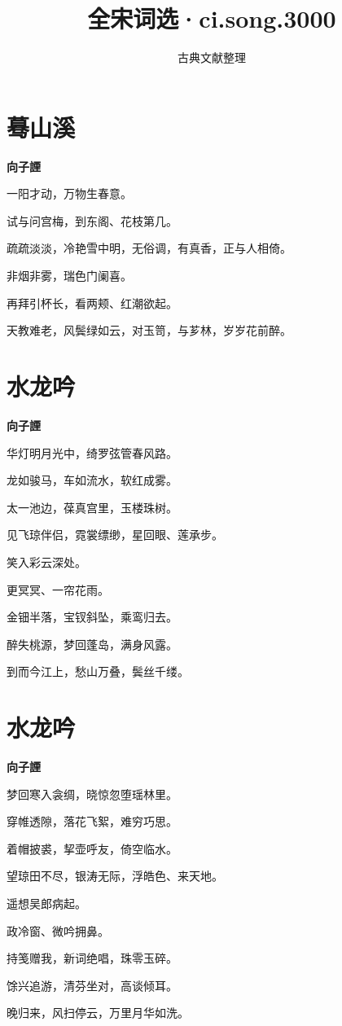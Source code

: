 \documentclass[12pt,a4paper]{ctexbook}
\title{全宋词选·ci.song.3000}
\author{古典文献整理}
\date{}
\begin{document}
\maketitle
\tableofcontents
\newpage
\section{蓦山溪}
\textbf{向子諲}\par\vspace{0.5em}
一阳才动，万物生春意。\par
试与问宫梅，到东阁、花枝第几。\par
疏疏淡淡，冷艳雪中明，无俗调，有真香，正与人相倚。\par
非烟非雾，瑞色门阑喜。\par
再拜引杯长，看两颊、红潮欲起。\par
天教难老，风鬓绿如云，对玉笥，与芗林，岁岁花前醉。\par

\section{水龙吟}
\textbf{向子諲}\par\vspace{0.5em}
华灯明月光中，绮罗弦管春风路。\par
龙如骏马，车如流水，软红成雾。\par
太一池边，葆真宫里，玉楼珠树。\par
见飞琼伴侣，霓裳缥缈，星回眼、莲承步。\par
笑入彩云深处。\par
更冥冥、一帘花雨。\par
金钿半落，宝钗斜坠，乘鸾归去。\par
醉失桃源，梦回蓬岛，满身风露。\par
到而今江上，愁山万叠，鬓丝千缕。\par

\section{水龙吟}
\textbf{向子諲}\par\vspace{0.5em}
梦回寒入衾绸，晓惊忽堕瑶林里。\par
穿帷透隙，落花飞絮，难穷巧思。\par
着帽披裘，挈壶呼友，倚空临水。\par
望琼田不尽，银涛无际，浮皓色、来天地。\par
遥想吴郎病起。\par
政冷窗、微吟拥鼻。\par
持笺赠我，新词绝唱，珠零玉碎。\par
馀兴追游，清芬坐对，高谈倾耳。\par
晚归来，风扫停云，万里月华如洗。\par
\end{document}
